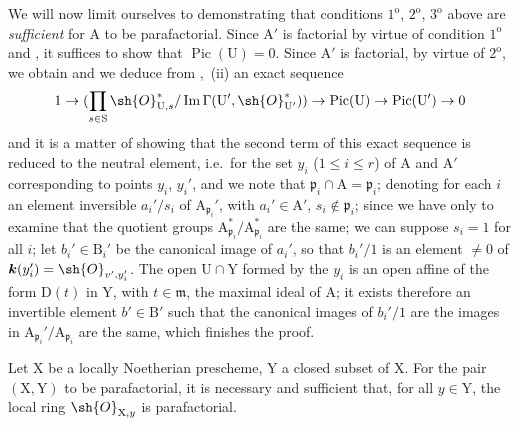 We will now limit ourselves to demonstrating that conditions $1^{\mathrm{o}}$, $2^{\mathrm{o}}$, $3^{\mathrm{o}}$ above are \emph{sufficient} for $\mathrm{A}$ to be parafactorial.
Since $\mathrm{A}'$ is factorial by virtue of condition $1^{\mathrm{o}}$ and , it suffices to show that $\operatorname{Pic}(\mathrm{U})=0$.
Since $\mathrm{A}'$ is factorial, by virtue of $2^{\mathrm{o}}$, we obtain and we deduce from ,~(ii) an exact sequence
\[
  1\to(\prod_{s\in\mathrm{S}}\sh{O}_{\mathrm{U},s}^*/\operatorname{Im}\Gamma(\mathrm{U}',\sh{O}_{\mathrm{U}'}^*))\to\operatorname{Pic}(\mathrm{U})\to\operatorname{Pic}(\mathrm{U}')\to 0
\]
and it is a matter of showing that the second term of this exact sequence is reduced to the neutral element, i.e.\ for the set $y_i$ ($1\leq i\leq r$) of $\mathrm{A}$ and $\mathrm{A}'$ corresponding to points $y_i$, $y_i'$, and we note that $\mathfrak{p}_i\cap\mathrm{A}=\mathfrak{p}_i$; denoting for each $i$ an element inversible $a_i'/s_i$ of $\mathrm{A}_{\mathfrak{p}_i}'$, with $a_i'\in\mathrm{A}'$, $s_i\notin\mathfrak{p}_i$; since we have only to examine that the quotient groups $\mathrm{A}_{\mathfrak{p}_i}^*/\mathrm{A}_{\mathfrak{p}_i}^*$ are the same; we can suppose $s_i=1$ for all $i$; let $b_i'\in\mathrm{B}_i'$ be the canonical image of $a_i'$, so that $b_i'/1$ is an element $\neq 0$ of $\boldsymbol{k}(y_i')=\sh{O}_{v',y_i'}$.
The open $\mathrm{U}\cap\mathrm{Y}$ formed by the $y_i$ is an open affine of the form $\mathrm{D}(t)$ in $\mathrm{Y}$, with $t\in\mathfrak{m}$, the maximal ideal of $\mathrm{A}$; it exists therefore an invertible element $b'\in\mathrm{B}'$ such that the canonical images of $b_i'/1$ are the images in $\mathrm{A}_{\mathfrak{p}_i}'/\mathrm{A}_{\mathfrak{p}_i}$ are the same, which finishes the proof.

\begin{proposition}[21.13.10]
\label{IV.21.13.10}
Let $\mathrm{X}$ be a locally Noetherian prescheme, $\mathrm{Y}$ a closed subset of $\mathrm{X}$.
For the pair $(\mathrm{X},\mathrm{Y})$ to be parafactorial, it is necessary and sufficient that, for all $y\in\mathrm{Y}$, the local ring $\sh{O}_{\mathrm{X},y}$ is parafactorial.
\end{proposition}

